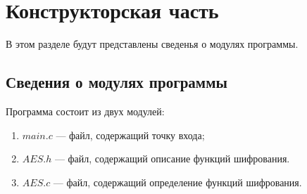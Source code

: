 \chapter{Конструкторская часть}
В этом разделе будут представлены сведенья о модулях программы.

\section{Сведения о модулях программы}
Программа состоит из двух модулей:
\begin{enumerate}[label=\arabic*)]
    \item $main.c$ --- файл, содержащий точку входа;
    \item $AES.h$ --- файл, содержащий описание функций шифрования.
    \item $AES.c$ --- файл, содержащий определение функций шифрования.
\end{enumerate}

